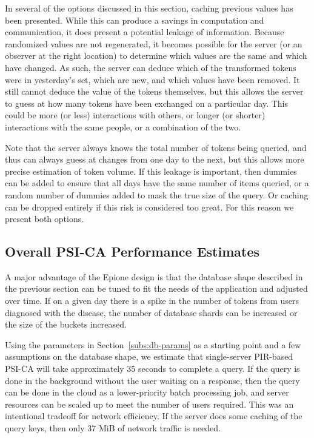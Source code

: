 \documentclass[11pt]{article} %
\newcommand{\sectionref}[1]{Section~\ref{#1}}
\newcommand{\dect}{\textsf{Epione}\xspace}
\newcommand{\psica}{PSI-CA\xspace}
\newcommand{\remove}[1]{}
\begin{document}
{	In several of the options discussed in this section, caching previous values has been presented. While this can produce a savings in computation and communication, it does present a potential leakage of information. Because randomized values are not regenerated, it becomes possible for the server (or an observer at the right location) to determine which values are the same and which have changed. As such, the server can deduce which of the transformed tokens were in yesterday's set, which are new, and which values have been removed. It still cannot deduce the value of the tokens themselves, but this allows the server to guess at how many tokens have been exchanged on a particular day. This could be more (or less) interactions with others, or longer (or shorter) interactions with the same people, or a combination of the two.
	
	Note that the server always knows the total number of tokens being queried, and thus can always guess at changes from one day to the next, but this allows more precise estimation of token volume. If this leakage is important, then dummies can be added to ensure that all days have the same number of items queried, or a random number of dummies added to mask the true size of the query. Or caching can be dropped entirely if this risk is considered too great. For this reason we present both options.
}

\subsection{Overall PSI-CA Performance Estimates} 
\remove{The performance estimates for the overall \psica algorithm are shown in Table~\ref{tbl:comp-summary} for computation and Table~\ref{tbl:comm-summary} for communication, each showing the effect of the implementation options discussed in this section. 
We also believe that single-server PIR is feasible. }

A major advantage of the \dect design is that the database shape described in the previous section can be tuned to fit the needs of the application and adjusted over time. If on a given day there is a spike in the number of tokens from users diagnosed with the disease, the number of database shards can be increased or the size of the buckets increased.

Using the parameters in \sectionref{subs:db-params} as a starting point and a few assumptions on the database shape, we estimate that single-server PIR-based PSI-CA will take approximately 35 seconds to complete a query. If the query is done in the background without the user waiting on a response, then the query can be done in the cloud as a lower-priority batch processing job, and server resources can be scaled up to meet the number of users required. This was an intentional tradeoff for network efficiency. If the server does some caching of the query keys, then only 37 MiB of network traffic is needed.
\end{document}
